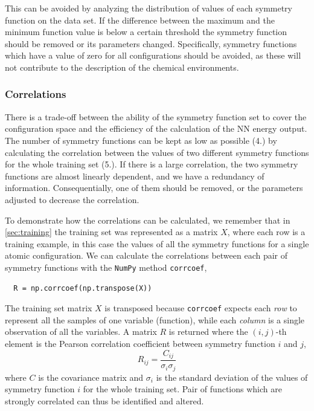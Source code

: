 \documentclass[twoside,english]{uiofysmaster}
\begin{document}
This can be avoided by analyzing the distribution of values of each symmetry function on the data set. If the difference 
between the maximum and the minimum function value is below a certain threshold
the symmetry function should be removed or its parameters changed. Specifically, 
symmetry functions which have a value of zero for all configurations should be avoided, as these will not contribute
to the description of the chemical environments. 

\subsubsection{Correlations}
There is a trade-off between the ability of the symmetry function set to cover the configuration space and 
the efficiency of the calculation of the NN energy output. The number of symmetry functions can be kept as low as 
possible (4.) by calculating the correlation between the values of two different symmetry functions for the whole 
training set (5.). If there is a large correlation, the two symmetry functions are almost linearly dependent, 
and we have a redundancy of information. Consequentially, one of them should be removed, or the parameters adjusted
to decrease the correlation.

To demonstrate how the correlations can be calculated, we remember that in 
\autoref{sec:training} the training set was represented as a matrix $X$, where
each row is a training example, in this case the values of all the symmetry functions for a single atomic configuration.
We can calculate the correlations between each pair of symmetry functions with the \texttt{NumPy} method \texttt{corrcoef}, 
\begin{verbatim}
  R = np.corrcoef(np.transpose(X))
\end{verbatim}
The training set matrix $X$ is transposed because \texttt{corrcoef} expects each \textit{row} to represent all the samples of one
variable (function), while each \textit{column} is a single observation of all the variables.
A matrix $R$ is returned where the $(i,j)$-th element is the Pearson correlation coefficient between 
symmetry function $i$ and $j$,
\begin{equation}
 R_{ij} = \frac{C_{ij}}{\sigma_i\sigma_j}
\end{equation}
where $C$ is the covariance matrix and $\sigma_i$ is the standard deviation of the values of symmetry function $i$ for 
the whole training set. Pair of functions which are strongly correlated can thus be identified and altered.
\end{document}
